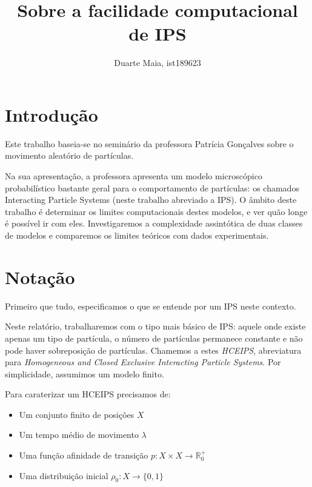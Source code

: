 \documentclass{article}
\title{Sobre a facilidade computacional de IPS}
\author{Duarte Maia, ist189623}
\date{}
\newcommand{\R}{\mathbb{R}}
\begin{document}
	\maketitle
	
	\tableofcontents

	\section{Introdução}

	Este trabalho baseia-se no seminário da professora Patrícia Gonçalves sobre o movimento aleatório de partículas.
	
	Na sua apresentação, a professora apresenta um modelo microscópico probabilístico bastante geral para o comportamento de partículas: os chamados Interacting Particle Systems (neste trabalho abreviado a IPS). O âmbito deste trabalho é determinar os limites computacionais destes modelos, e ver quão longe é possível ir com eles. Investigaremos a complexidade assintótica de duas classes de modelos e comparemos os limites teóricos com dados experimentais.

	\section{Notação}

	Primeiro que tudo, especificamos o que se entende por um IPS neste contexto.
	
	Neste relatório, trabalharemos com o tipo mais básico de IPS: aquele onde existe apenas um tipo de partícula, o número de partículas permanece constante e não pode haver sobreposição de partículas. Chamemos a estes \emph{HCEIPS}, abreviatura para \emph{Homogeneous and Closed Exclusive Interacting Particle Systems}. Por simplicidade, assumimos um modelo finito.
	
	Para caraterizar um HCEIPS precisamos de:
	
	\begin{itemize}
	\item Um conjunto finito de posições $X$
	
	\item Um tempo médio de movimento $\lambda$
	
	\item Uma função afinidade de transição $p : X \times X \rightarrow \R^+_0$
	
	\item Uma distribuição inicial $\rho_0 : X \rightarrow \{0,1\}$
	\end{itemize}
	
\end{document}
